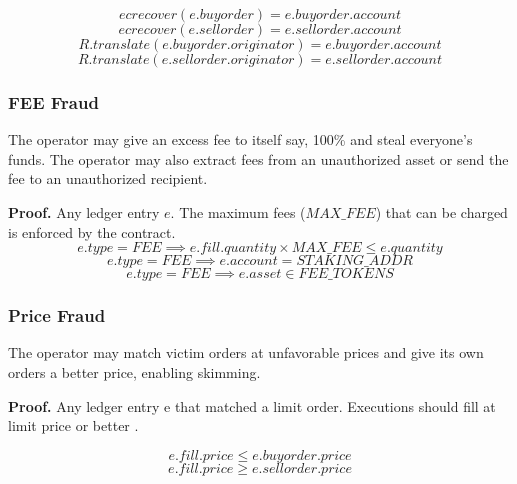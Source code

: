 \documentclass[12pt,a4paper]{article}
\begin{document}
\begin{equation}ecrecover(e.buyorder) = e.buyorder.account\end{equation}
\begin{equation}
ecrecover(e.sellorder) = e.sellorder.account
\end{equation}
\begin{equation}
    R.translate(e.buyorder.originator) = e.buyorder.account
\end{equation}
\begin{equation}
    R.translate(e.sellorder.originator) = e.sellorder.account    
\end{equation}
 
\subsubsection{FEE Fraud} \label{fp:fee}
The operator may give an excess fee to itself say, 100\% and steal everyone’s funds. The operator may also extract fees from an unauthorized asset or send the fee to an unauthorized recipient.

\textbf{Proof.} 
Any ledger entry $e$. The maximum fees ($MAX\_FEE$) that can be charged is enforced by the contract.
\begin{equation}
    e.type = FEE \implies e.fill.quantity \times MAX\_FEE \leq e.quantity
\end{equation}
\begin{equation}
    e.type = FEE \implies e.account = STAKING\_ADDR
\end{equation}
\begin{equation}
    e.type = FEE \implies e.asset \in FEE\_TOKENS 
\end{equation}

\subsubsection{Price Fraud} \label{fp:prc}
The operator may match victim orders at unfavorable prices and give its own orders a better price, enabling skimming.

\textbf{Proof.} Any ledger entry e that matched a limit order. Executions should fill at limit price or better . 

\begin{equation}
    e.fill.price \leq e.buyorder.price
\end{equation}
\begin{equation}
    e.fill.price \geq e.sellorder.price
\end{equation}
\end{document}
